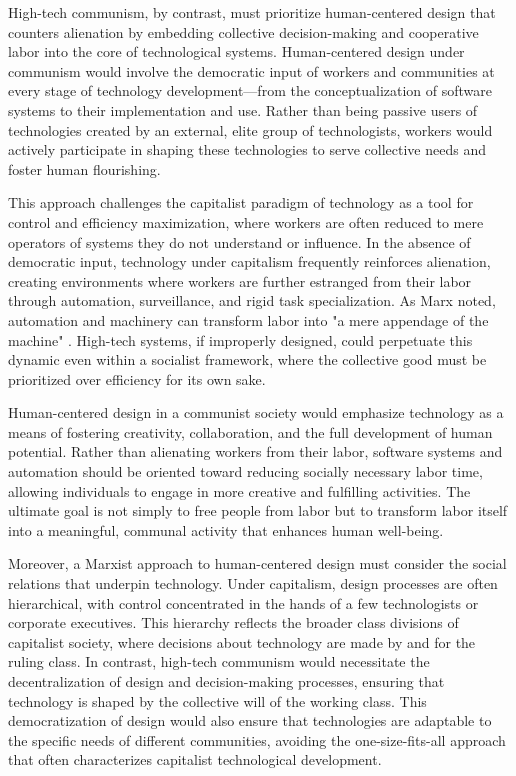 \begin{refsection}
High-tech communism, by contrast, must prioritize human-centered design that counters alienation by embedding collective decision-making and cooperative labor into the core of technological systems. Human-centered design under communism would involve the democratic input of workers and communities at every stage of technology development—from the conceptualization of software systems to their implementation and use. Rather than being passive users of technologies created by an external, elite group of technologists, workers would actively participate in shaping these technologies to serve collective needs and foster human flourishing.

This approach challenges the capitalist paradigm of technology as a tool for control and efficiency maximization, where workers are often reduced to mere operators of systems they do not understand or influence. In the absence of democratic input, technology under capitalism frequently reinforces alienation, creating environments where workers are further estranged from their labor through automation, surveillance, and rigid task specialization. As Marx noted, automation and machinery can transform labor into "a mere appendage of the machine" \cite[pp.~549]{marx_capital_vol1}. High-tech systems, if improperly designed, could perpetuate this dynamic even within a socialist framework, where the collective good must be prioritized over efficiency for its own sake.

Human-centered design in a communist society would emphasize technology as a means of fostering creativity, collaboration, and the full development of human potential. Rather than alienating workers from their labor, software systems and automation should be oriented toward reducing socially necessary labor time, allowing individuals to engage in more creative and fulfilling activities. The ultimate goal is not simply to free people from labor but to transform labor itself into a meaningful, communal activity that enhances human well-being.

Moreover, a Marxist approach to human-centered design must consider the social relations that underpin technology. Under capitalism, design processes are often hierarchical, with control concentrated in the hands of a few technologists or corporate executives. This hierarchy reflects the broader class divisions of capitalist society, where decisions about technology are made by and for the ruling class. In contrast, high-tech communism would necessitate the decentralization of design and decision-making processes, ensuring that technology is shaped by the collective will of the working class. This democratization of design would also ensure that technologies are adaptable to the specific needs of different communities, avoiding the one-size-fits-all approach that often characterizes capitalist technological development.


\end{refsection}
